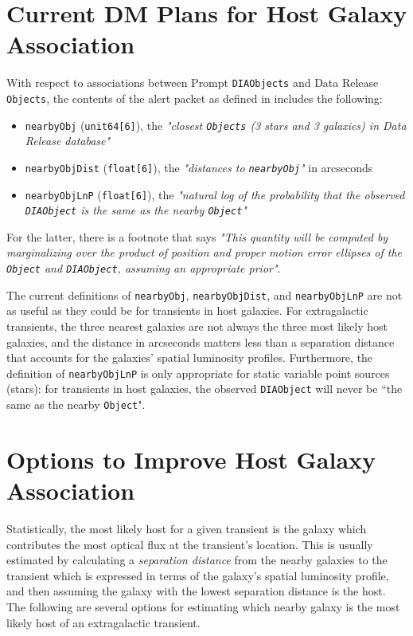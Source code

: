 \documentclass[DM,lsstdraft,authoryear,toc]{lsstdoc}
\begin{document}
\section{Current DM Plans for Host Galaxy Association}\label{sec:DMplans}

With respect to associations between Prompt {\tt DIAObjects} and Data Release {\tt Objects}, the contents of the alert packet as defined in  includes the following:
\begin{itemize}
\item {\tt nearbyObj} ({\tt unit64[6]}), the {\it "closest {\tt Objects} (3 stars and 3 galaxies) in Data Release database"}
\item {\tt nearbyObjDist} ({\tt float[6]}), the {\it "distances to {\tt nearbyObj}"} in arcseconds
\item {\tt nearbyObjLnP} ({\tt float[6]}), the {\it "natural log of the probability that the observed {\tt DIAObject} is the same as the nearby {\tt Object}"}
\end{itemize}
For the latter, there is a footnote that says {\it "This quantity will be computed by marginalizing over the product of position and proper motion error ellipses of the {\tt Object} and {\tt DIAObject}, assuming an appropriate prior"}.

The current definitions of {\tt nearbyObj}, {\tt nearbyObjDist}, and {\tt nearbyObjLnP} are not as useful as they could be for transients in host galaxies. 
For extragalactic transients, the three nearest galaxies are not always the three most likely host galaxies, and the distance in arcseconds matters less than a separation distance that accounts for the galaxies' spatial luminosity profiles.
Furthermore, the definition of {\tt nearbyObjLnP} is only appropriate for static variable point sources (stars): for transients in host galaxies, the observed {\tt DIAObject} will never be ``the same as the nearby {\tt Object}".


\section{Options to Improve Host Galaxy Association}\label{sec:options}

Statistically, the most likely host for a given transient is the galaxy which contributes the most optical flux at the transient's location.
This is usually estimated by calculating a \emph{separation distance} from the nearby galaxies to the transient which is expressed in terms of the galaxy's spatial luminosity profile, and then assuming the galaxy with the lowest separation distance is the host.
The following are several options for estimating which nearby galaxy is the most likely host of an extragalactic transient.
\end{document}

